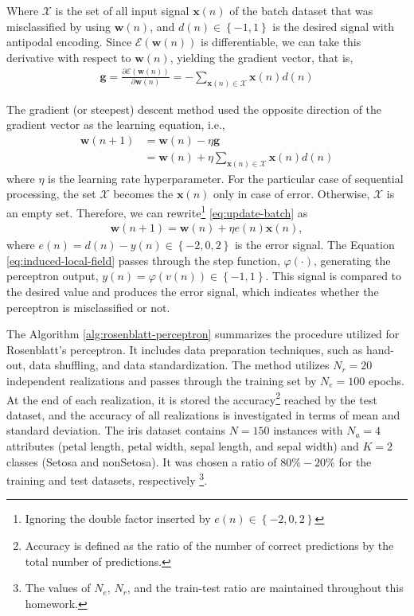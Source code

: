 \documentclass[12pt,a4paper]{article}
\begin{document}
Where \(\mathscr{X}\) is the set of all input signal \(\mathbf{x}(n)\) of the batch dataset that was misclassified by using \(\mathbf{w}(n)\), and \(d(n) \in \left\{ -1, 1 \right\}\) is the desired signal with antipodal encoding. Since \(\mathscr{E}\left( \mathbf{w} \left( n \right) \right)\) is differentiable, we can take this derivative with respect to \(\mathbf{w}(n)\), yielding the gradient vector, that is,
\begin{align}
    \mathbf{g} = \frac{\partial\mathscr{E} \left( \mathbf{w}(n) \right)}{\partial \mathbf{w}(n)} = - \sum_{\mathbf{x}(n) \in \mathscr{X}} \mathbf{x}(n) d(n)
\end{align}

The gradient (or steepest) descent method used the opposite direction of the gradient vector as the learning equation, i.e.,
\begin{align}
    \label{eq:update-batch}
    \mathbf{w}(n+1) & = \mathbf{w}(n) - \eta \mathbf{g} \\
                    & = \mathbf{w}(n) + \eta \sum_{\mathbf{x}(n) \in \mathscr{X}} \mathbf{x}(n) d(n)
\end{align}
where \(\eta\) is the learning rate hyperparameter. For the particular case of sequential processing, the set \(\mathscr{X}\) becomes the \(\mathbf{x}(n)\) only in case of error. Otherwise, \(\mathscr{X}\) is an empty set. Therefore, we can rewrite\footnote{Ignoring the double factor inserted by \(e(n) \in \left\{ -2,0,2 \right\}\)} \eqref{eq:update-batch} as
\begin{align}
    \mathbf{w}(n+1) = \mathbf{w}(n) + \eta e(n) \mathbf{x}(n),
\end{align}
where \(e(n) = d(n) - y(n) \in \left\{ -2, 0, 2 \right\}\) is the error signal.
The Equation \eqref{eq:induced-local-field} passes through the step function, \(\varphi \left( \cdot \right)\), generating the perceptron output, \(y\left( n \right) = \varphi(v\left( n \right)) \in \left\{ -1,1 \right\}\). This signal is compared to the desired value and produces the error signal, which indicates whether the perceptron is misclassified or not.

The Algorithm \ref{alg:rosenblatt-perceptron} summarizes the procedure utilized for Rosenblatt's perceptron. It includes data preparation techniques, such as hand-out, data shuffling, and data standardization. The method utilizes \(N_r=20\) independent realizations and passes through the training set by \(N_e=100\) epochs. At the end of each realization, it is stored the accuracy\footnote{Accuracy is defined as the ratio of the number of correct predictions by the total number of predictions.} reached by the test dataset, and the accuracy of all realizations is investigated in terms of mean and standard deviation. The iris dataset contains \(N=150\) instances with \(N_a=4\) attributes (petal length, petal width, sepal length, and sepal width) and \(K=2\) classes (Setosa and nonSetosa). It was chosen a ratio of \(80\%-20\%\) for the training and test datasets, respectively \footnote{The values of \(N_e\), \(N_r\), and the train-test ratio are maintained throughout this homework.}.
\end{document}
